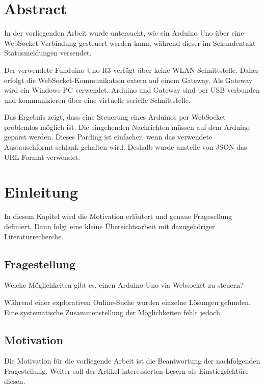 \hypertarget{abstract}{%
\section{Abstract}\label{abstract}}

In der vorliegenden Arbeit wurde untersucht, wie ein Arduino Uno über
eine WebSocket-Verbindung gesteuert werden kann, während dieser im
Sekundentakt Statusmeldungen versendet.

Der verwendete Funduino Uno R3 \autocite{lernset} verfügt über keine
WLAN-Schnittstelle. Daher erfolgt die WebSocket-Kommunikation extern auf
einem Gateway. Als Gateway wird ein Windows-PC verwendet. Arduino und
Gateway sind per USB verbunden und kommunizieren über eine virtuelle
serielle Schnittstelle.

Das Ergebnis zeigt, dass eine Steuerung eines Arduinos per WebSocket
problemlos möglich ist. Die eingehenden Nachrichten müssen auf dem
Arduino geparst werden. Dieses Parding ist einfacher, wenn das
verwendete Austauschformt schlank gehalten wird. Deshalb wurde anstelle
von JSON das URL Format verwendet.

\hypertarget{einleitung}{%
\section{Einleitung}\label{einleitung}}

In diesem Kapitel wird die Motivation erläutert und genaue Fragesellung
definiert. Dann folgt eine kleine Übersichtsarbeit mit dazugehöriger
Literaturrecherche.

\hypertarget{fragestellung}{%
\subsection{Fragestellung}\label{fragestellung}}

Welche Möglichkeiten gibt es, einen Arduino Uno via Websocket zu
steuern?

Während einer explorativen Online-Suche wurden einzelne Lösungen
gefunden. Eine systematische Zusammenstellung der Möglichkeiten fehlt
jedoch.

\hypertarget{motivation}{%
\subsection{Motivation}\label{motivation}}

Die Motivation für die vorliegende Arbeit ist die Beantwortung der
nachfolgenden Fragestellung. Weiter soll der Artikel interessierten
Lesern als Einstiegslektüre diesen.


